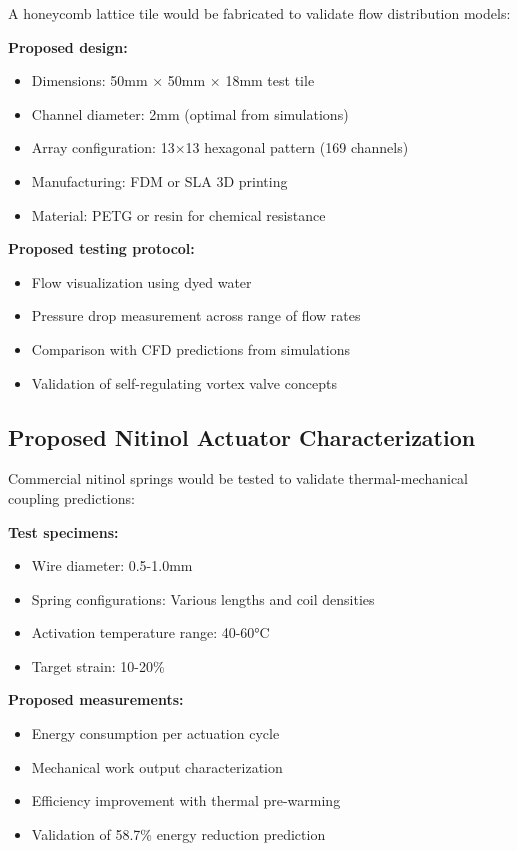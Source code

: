 A honeycomb lattice tile would be fabricated to validate flow distribution models:

\textbf{Proposed design:}
\begin{itemize}
    \item Dimensions: 50mm × 50mm × 18mm test tile
    \item Channel diameter: 2mm (optimal from simulations)
    \item Array configuration: 13×13 hexagonal pattern (169 channels)
    \item Manufacturing: FDM or SLA 3D printing
    \item Material: PETG or resin for chemical resistance
\end{itemize}

\textbf{Proposed testing protocol:}
\begin{itemize}
    \item Flow visualization using dyed water
    \item Pressure drop measurement across range of flow rates
    \item Comparison with CFD predictions from simulations
    \item Validation of self-regulating vortex valve concepts
\end{itemize}

\subsection{Proposed Nitinol Actuator Characterization}

Commercial nitinol springs would be tested to validate thermal-mechanical coupling predictions:

\textbf{Test specimens:}
\begin{itemize}
    \item Wire diameter: 0.5-1.0mm
    \item Spring configurations: Various lengths and coil densities
    \item Activation temperature range: 40-60°C
    \item Target strain: 10-20\%
\end{itemize}

\textbf{Proposed measurements:}
\begin{itemize}
    \item Energy consumption per actuation cycle
    \item Mechanical work output characterization
    \item Efficiency improvement with thermal pre-warming
    \item Validation of 58.7\% energy reduction prediction
\end{itemize}

